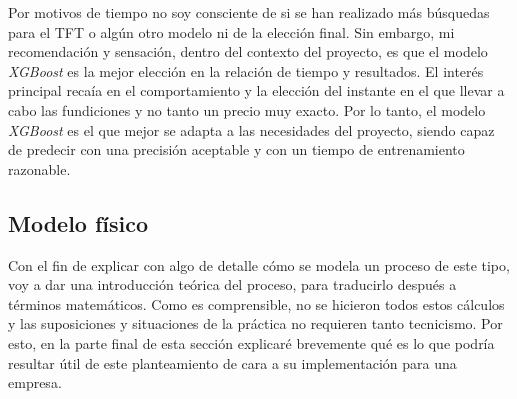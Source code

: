 Por motivos de tiempo no soy consciente de si se han realizado más búsquedas para el TFT o algún otro modelo ni de la elección final. Sin embargo, mi recomendación y sensación, dentro del contexto del proyecto, es que el modelo \textit{XGBoost} es la mejor elección en la relación de tiempo y resultados. El interés principal recaía en el comportamiento y la elección del instante en el que llevar a cabo las fundiciones y no tanto un precio muy exacto. Por lo tanto, el modelo \textit{XGBoost} es el que mejor se adapta a las necesidades del proyecto, siendo capaz de predecir con una precisión aceptable y con un tiempo de entrenamiento razonable.
%
%
%
\subsection{Modelo físico}
%
%
Con el fin de explicar con algo de detalle cómo se modela un proceso de este tipo, voy a dar una introducción teórica del proceso, para traducirlo después a términos matemáticos. Como es comprensible, no se hicieron todos estos cálculos y las suposiciones y situaciones de la práctica no requieren tanto tecnicismo. Por esto, en la parte final de esta sección explicaré brevemente qué es lo que podría resultar útil de este planteamiento de cara a su implementación para una empresa.
%
%
%
